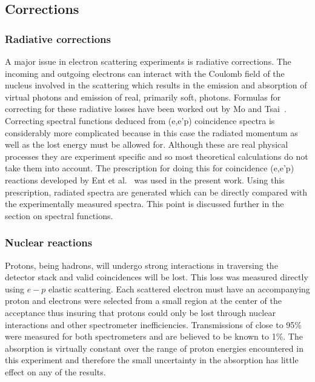 \documentclass[aps,prl,twocolumn,showpacs,amsmath,amssymb,floats]{revtex4}
\begin{document}
\subsection*{Corrections} 
 
\subsubsection*{Radiative corrections} 

A major issue in electron scattering experiments is radiative corrections.  
The incoming and outgoing electrons can interact with the Coulomb field of the 
nucleus involved in the scattering which results in the emission and absorption 
of virtual photons and emission of real, primarily soft, photons.  Formulas for 
correcting for these radiative losses have been worked out by Mo and 
Tsai~\cite{motsai69}.  Correcting spectral functions deduced from (e,e'p) 
coincidence spectra is considerably more complicated because in this case the 
radiated momentum as well as the lost energy must be allowed for.  Although 
these are real physical processes they are experiment specific and so most 
theoretical calculations do not take them into account. The prescription for 
doing this for coincidence (e,e'p) reactions developed by Ent et al.~\cite{ent02} was used in the present work.   Using this prescription, 
radiated spectra are generated which can be directly compared with the 
experimentally measured spectra.  This point is discussed further in the 
section on spectral functions. 

\subsubsection*{Nuclear reactions}

Protons, being hadrons, will undergo strong interactions in traversing the 
detector stack and valid coincidences will be lost.  This loss was measured 
directly using $e-p$ elastic scattering.  Each scattered electron must 
have an accompanying proton and electrons were selected from a small region at 
the center of the acceptance thus insuring that protons could only be lost 
through nuclear interactions and other spectrometer inefficiencies.  
Transmissions of close to 95\% were measured for both spectrometers and are 
believed to be known to 1\%.  The absorption is virtually constant over the 
range of proton energies encountered in this experiment and therefore the small 
uncertainty in the absorption has little effect on any of the results. 
\end{document}
